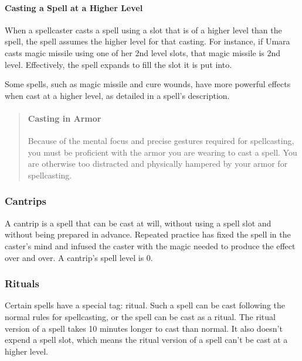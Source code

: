 \documentclass[
]{article}
\begin{document}
\hypertarget{casting-a-spell-at-a-higher-level}{%
\paragraph{Casting a Spell at a Higher
Level}\label{casting-a-spell-at-a-higher-level}}

When a spellcaster casts a spell using a slot that is of a higher level
than the spell, the spell assumes the higher level for that casting. For
instance, if Umara casts magic missile using one of her 2nd level slots,
that magic missile is 2nd level. Effectively, the spell expands to fill
the slot it is put into.

Some spells, such as magic missile and cure wounds, have more powerful
effects when cast at a higher level, as detailed in a spell's
description.

\begin{quote}
\mbox{}%
\hypertarget{casting-in-armor}{%
\paragraph{Casting in Armor}\label{casting-in-armor}}

Because of the mental focus and precise gestures required for
spellcasting, you must be proficient with the armor you are wearing to
cast a spell. You are otherwise too distracted and physically hampered
by your armor for spellcasting.
\end{quote}

\hypertarget{cantrips}{%
\subsubsection{Cantrips}\label{cantrips}}

A cantrip is a spell that can be cast at will, without using a spell
slot and without being prepared in advance. Repeated practice has fixed
the spell in the caster's mind and infused the caster with the magic
needed to produce the effect over and over. A cantrip's spell level is
0.

\hypertarget{rituals}{%
\subsubsection{Rituals}\label{rituals}}

Certain spells have a special tag: ritual. Such a spell can be cast
following the normal rules for spellcasting, or the spell can be cast as
a ritual. The ritual version of a spell takes 10 minutes longer to cast
than normal. It also doesn't expend a spell slot, which means the ritual
version of a spell can't be cast at a higher level.
\end{document}
